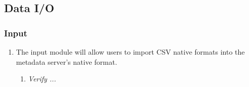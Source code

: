 \subsection{Data I/O}
\label{sec:data_io_spec} 

\subsubsection{Input}
	\begin{enumerate}
		\item The input module will allow users to import CSV native formats into the metadata server’s native format.

		\begin{enumerate}
			\item \textit{Verify ...}
		\end{enumerate}

	\end{enumerate}
